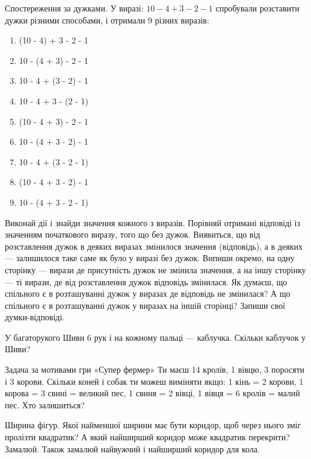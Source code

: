 \problem
Спостереження за дужками.
У виразі: $10 - 4 + 3 - 2 - 1$ спробували розставити дужки різними способами,
і отримали 9 різних виразів:
\begin{multicols}{2}
    \begin{enumerate}
        \item (10 - 4) + 3 - 2 - 1
        \item 10 - (4 + 3) - 2 - 1
        \item 10 - 4 + (3 - 2) - 1
        \item 10 - 4 + 3 - (2 - 1)
        \item (10 - 4 + 3) - 2 - 1
        \item 10 - (4 + 3 - 2) - 1
        \item 10 - 4 + (3 - 2 - 1)
        \item (10 - 4 + 3 - 2) - 1
        \item 10 - (4 + 3 - 2 - 1)
    \end{enumerate}
\end{multicols}
Виконай дії і знайди значення кожного з виразів.
Порівняй отримані відповіді із значенням початкового виразу,
того що без дужок.
Виявиться, що від розставлення дужок в деяких виразах змінилося
значення (відповідь), а в деяких --- залишилося таке саме
як було у виразі без дужок.
Випиши окремо, на одну сторінку --- вирази де присутність дужок
не змінила значення, а на іншу сторінку --- ті вирази,
де від розставлення дужок відповідь змінилася.
Як думаєш, що спільного є в розташуванні дужок у виразах
де відповідь не змінилася?
А що спільного є в розташуванні дужок у виразах на іншій сторінці?
Запиши свої думки-відповіді.


\problem
У багаторукого Шиви 6 рук і на кожному пальці --- каблучка.
Скільки каблучок у Шиви?


\problem
Задача за мотивами гри «Супер фермер»
Ти маєш 14 кролів, 1 вівцю, 3 поросяти і 3 корови. 
Скільки коней і собак ти можеш виміняти якщо: 
1 кінь = 2 корови, 
1 корова = 3 свині = великий пес, 
1 свиня = 2 вівці, 
1 вівця = 6 кролів = малий пес. 
Хто залишиться?


\problem
Ширина фігур.
Якої найменшої ширини має бути коридор,
щоб через нього зміг пролізти квадратик?
А який найширший коридор може квадратик перекрити?
Замалюй. Також замалюй найвужчий і найширший коридор для кола.


